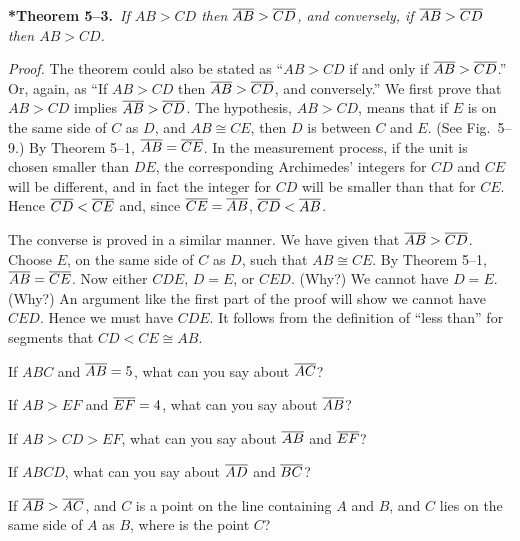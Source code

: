 \documentclass[11pt]{book}
\begin{document}
\medskip\noindent
\textbf{*Theorem 5--3.}\ \emph{If $AB > CD$ then $\overline{AB} > \overline{CD}$, and
conversely, if $\overline{AB} > \overline{CD}$ then $AB > CD$.}
\par\medskip

\noindent\emph{Proof.} The theorem could also be stated as ``$AB > CD$ if and
only if $\overline{AB} > \overline{CD}$.'' Or, again, as ``If $AB > CD$ then
$\overline{AB} > \overline{CD}$, and conversely.'' We first prove that $AB > CD$ implies
$\overline{AB} > \overline{CD}$. The hypothesis, $AB > CD$, means that if $E$ is on the
same side of $C$ as $D$, and $AB \cong CE$, then $D$ is between $C$ and $E$.
(See Fig.~5--9.) By Theorem 5--1, $\overline{AB} = \overline{CE}$. In the measurement
process, if the unit is chosen smaller than $DE$, the corresponding Archimedes'
integers for $CD$ and $CE$ will be different, and in fact the integer for $CD$
will be smaller than that for $CE$. Hence $\overline{CD} < \overline{CE}$ and, since
$\overline{CE} = \overline{AB}$, $\overline{CD} < \overline{AB}$.

\FIGVNINE

The converse is proved in a similar manner. We have given that
$\overline{AB} > \overline{CD}$. Choose $E$, on the same side of $C$ as $D$, such that
$AB \cong CE$. By Theorem 5--1, $\overline{AB} = \overline{CE}$. Now either $CDE$,
$D = E$, or $CED$. (Why?) We cannot have $D = E$. (Why?) An argument like the
first part of the proof will show we cannot have $CED$. Hence we must have
$CDE$. It follows from the definition of ``less than'' for segments that
$CD < CE \cong AB$.


\begin{exercisecols}
\begin{exlist}
\item If $ABC$ and $\overline{AB} = 5$, what can you say about $\overline{AC}$?
\item If $AB > EF$ and $\overline{EF} = 4$, what can you say about $\overline{AB}$?
\item If $AB > CD > EF$, what can you say about $\overline{AB}$ and $\overline{EF}$?
\item If $ABCD$, what can you say about $\overline{AD}$ and $\overline{BC}$?
\item If $\overline{AB} > \overline{AC}$, and $C$ is a point on the line containing $A$ and
      $B$, and $C$ lies on the same side of $A$ as $B$, where is the point $C$?
\end{exlist}
\end{exercisecols}

\end{document}
